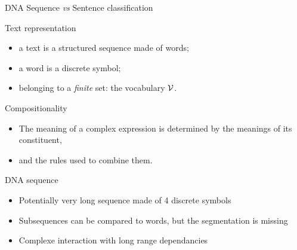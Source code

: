 \begin{frame}{DNA Sequence \textit{vs} Sentence classification}
  \begin{block}{Text representation}
    \begin{itemize}
    \item a text is a structured sequence made of words;
    \item a word is a discrete symbol;
    \item belonging to a \textit{finite} set: the vocabulary ${\mathcal{V}}$. 
    \end{itemize}
  \end{block}
  \begin{block}{Compositionality}
    \begin{itemize}
    \item {The meaning of a complex expression is determined by the
        meanings of its constituent,}
    \item {\color{red}and the rules used to combine them. }
    \end{itemize}
  \end{block}
  \begin{block}{DNA sequence}
    \begin{itemize}
    \item Potentially very long sequence made of 4 discrete symbols
    \item Subsequences can be compared to words, but the segmentation is missing
    \item Complexe interaction with long range dependancies 
    \end{itemize}
  \end{block}
\end{frame}

\endinput



